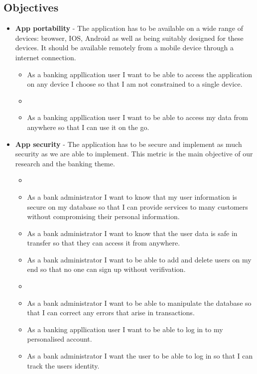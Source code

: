     \subsection{Objectives}
    \begin{itemize}
    \item \textbf{App portability} - The application has to be available on a wide range of devices: browser, IOS, Android as well as being suitably designed for these devices. It should be available remotely from a mobile device through a internet connection.
        \begin{itemize}
        \item As a banking appllication user I want to be able to access the application on any device I choose so that I am not constrained to a single device.
        \item\item As a banking appllication user I want to be able to access my data from anywhere so that I can use it on the go.
        \end{itemize}
    \item  \textbf{App security} - The application has to be secure and implement as much security as we are able to implement. This metric is the main objective of our research and the banking theme.
        \begin{itemize}
        \item\item As a bank administrator I want to know that my user information is secure on my database so that I can provide services to many customers without compromising their personal information.
        \item As a bank administrator I want to know that the user data is safe in transfer so that they can access it from anywhere.
        \item As a bank administrator I want to be able to add and delete users on my end so that no one can sign up without verifivation.
        \item \item As a bank administrator I want to be able to manipulate the database so that I can correct any errors that arise in transactions.
        \item As a banking appllication user I want to be able to log in to my personalised account.
        \item As a bank administrator I want the user to be able to log in so that I can track the users identity.
        \end{itemize}

\end{itemize}
